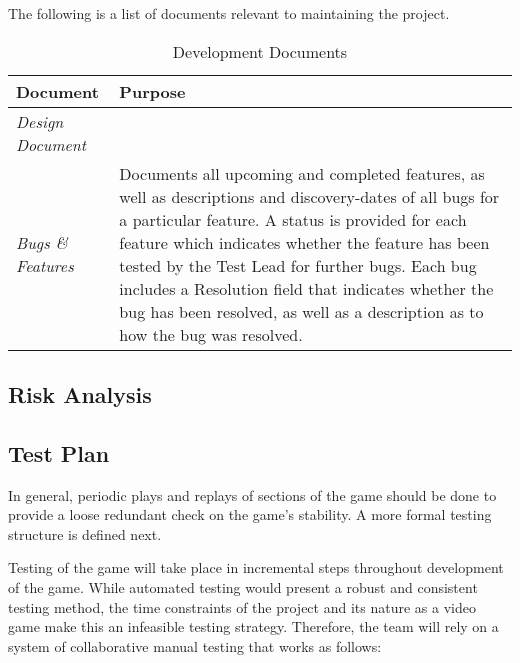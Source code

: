\documentclass[12pt,titlepage]{article}
\begin{document}
The following is a list of documents relevant to maintaining the project.

\begin{table}[H]
\centering
\caption{Development Documents}
\begin{tabularx}{\linewidth}{|l|X|}
\hline
{\bf Document}         & {\bf Purpose} \\ \hline
{\it Design Document}  & \\ \hline
{\it Bugs \& Features} & Documents all upcoming and completed features, as well
                         as descriptions and discovery-dates of all bugs for a
                         particular feature. A status is provided for each
                         feature which indicates whether the feature has been
                         tested by the Test Lead for further bugs. Each bug
                         includes a Resolution field that indicates whether the
                         bug has been resolved, as well as a description as to
                         how the bug was resolved. \\ \hline
\end{tabularx}
\end{table}


\subsection{Risk Analysis}

\subsection{Test Plan}

In general, periodic plays and replays of sections of the game should be done to
provide a loose redundant check on the game's stability. A more formal testing
structure is defined next.

Testing of the game will take place in incremental steps throughout development
of the game. While automated testing would present a robust and consistent
testing method, the time constraints of the project and its nature as a video
game make this an infeasible testing strategy. Therefore, the team will rely on
a system of collaborative manual testing that works as follows:
\end{document}
